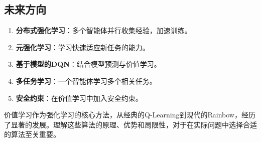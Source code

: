 \subsection{未来方向}

\begin{enumerate}
    \item \textbf{分布式强化学习}：多个智能体并行收集经验，加速训练。
    \item \textbf{元强化学习}：学习快速适应新任务的能力。
    \item \textbf{基于模型的DQN}：结合模型预测与价值学习。
    \item \textbf{多任务学习}：一个智能体学习多个相关任务。
    \item \textbf{安全约束}：在价值学习中加入安全约束。
\end{enumerate}

价值学习作为强化学习的核心方法，从经典的Q-Learning到现代的Rainbow，经历了显著的发展。理解这些算法的原理、优势和局限性，对于在实际问题中选择合适的算法至关重要。
